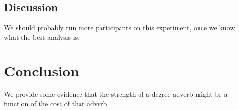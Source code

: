 \documentclass[10pt,letterpaper]{article}
\begin{document}
  \subsection{Discussion}
  
  We should probably run more participants on this experiment, once we know what the best analysis is.
  
  \section{Conclusion}
  
  We provide some evidence that the strength of a degree adverb might be a function of the cost of that adverb.

\nocite{web1t5gram}
\nocite{lewis}



\setlength{\bibleftmargin}{.125in}
\setlength{\bibindent}{-\bibleftmargin}


\end{document}
